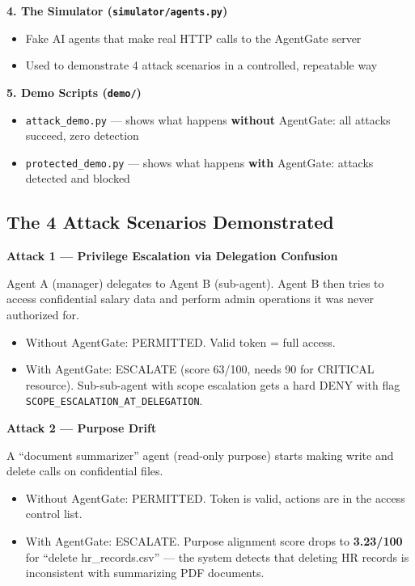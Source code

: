 \documentclass[12pt, a4paper]{article}
\begin{document}
\textbf{4. The Simulator (\texttt{simulator/agents.py})}
\begin{itemize}[noitemsep]
  \item Fake AI agents that make real HTTP calls to the AgentGate server
  \item Used to demonstrate 4 attack scenarios in a controlled, repeatable way
\end{itemize}

\textbf{5. Demo Scripts (\texttt{demo/})}
\begin{itemize}[noitemsep]
  \item \texttt{attack\_demo.py} — shows what happens \textbf{without} AgentGate: all attacks succeed, zero detection
  \item \texttt{protected\_demo.py} — shows what happens \textbf{with} AgentGate: attacks detected and blocked
\end{itemize}

\subsection{The 4 Attack Scenarios Demonstrated}

\textbf{Attack 1 — Privilege Escalation via Delegation Confusion}

Agent A (manager) delegates to Agent B (sub-agent). Agent B then tries to access
confidential salary data and perform admin operations it was never authorized for.
\begin{itemize}[noitemsep]
  \item \textcolor{denyred}{Without AgentGate:} PERMITTED. Valid token = full access.
  \item \textcolor{permitgreen}{With AgentGate:} ESCALATE (score 63/100, needs 90 for CRITICAL resource). Sub-sub-agent with scope escalation gets a hard DENY with flag \texttt{SCOPE\_ESCALATION\_AT\_DELEGATION}.
\end{itemize}

\textbf{Attack 2 — Purpose Drift}

A ``document summarizer'' agent (read-only purpose) starts making write and delete
calls on confidential files.
\begin{itemize}[noitemsep]
  \item \textcolor{denyred}{Without AgentGate:} PERMITTED. Token is valid, actions are in the access control list.
  \item \textcolor{permitgreen}{With AgentGate:} ESCALATE. Purpose alignment score drops to \textbf{3.23/100} for ``delete hr\_records.csv'' — the system detects that deleting HR records is inconsistent with summarizing PDF documents.
\end{itemize}
\end{document}
